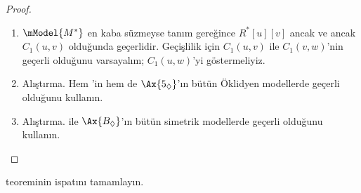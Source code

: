 \documentclass[../../../include/open-logic-section]{subfiles}
\begin{document}
\begin{proof}
\begin{enumerate}
  \item $\mModel{M^*}$ en kaba süzmeyse tanım gereğince $R^*[u][v]$
    ancak ve ancak $C_1(u,v)$ olduğunda geçerlidir. Geçişlilik için
    $C_1(u,v)$ ile $C_1(v,w)$'nin geçerli olduğunu varsayalım;
    $C_1(u,w)$'yi göstermeliyiz.
  \item Alıştırma. Hem 'in hem de $\Ax{5_\Diamond}$'ın bütün
    Öklidyen modellerde geçerli olduğunu kullanın.
  \item Alıştırma.  ile $\Ax{B_\Diamond}$'ın bütün simetrik
    modellerde geçerli olduğunu kullanın.
\end{enumerate}
\end{proof}

\begin{prob}
   teoreminin ispatını
  tamamlayın.
\end{prob}
\end{document}
